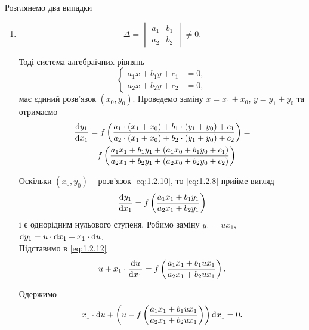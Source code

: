 Розглянемо два випадки
\begin{enumerate}
	\item 
	\begin{equation}
		\label{eq:1.2.9}
		\Delta = \begin{vmatrix} a_1 & b_1 \\ a_2 & b_2 \end{vmatrix} \ne 0.
	\end{equation}

	Тоді система алгебраїчних рівнянь
	\begin{equation}
		\label{eq:1.2.10}
		\left\{
			\begin{aligned}
				a_1 x + b_1 y + c_1 &= 0, \\
				a_2 x + b_2 y + c_2 &= 0,
			\end{aligned}
		\right.
	\end{equation}
	має єдиний розв’язок $(x_0, y_0)$. Проведемо заміну $x = x_1 + x_0$, $y = y_1 + y_0$ та отримаємо
	\begin{multline}
		\label{eq:1.2.11}
		\frac{\mathop{}\!\mathrm{d} y_1}{\mathop{}\!\mathrm{d} x_1} = f \left( \frac{a_1 \cdot (x_1 + x_0) + b_1 \cdot (y_1 + y_0) + c_1}{a_2 \cdot (x_1 + x_0) + b_2 \cdot (y_1 + y_0) + c_2} \right) = \\
		= f \left( \frac{a_1 x_1 + b_1 y_1 + (a_1 x_0 + b_1 y_0 + c_1)}{a_2 x_1 + b_2 y_1 + (a_2 x_0 + b_2 y_0 + c_2)} \right)
	\end{multline}

	Оскільки $(x_0, y_0)$ -- розв’язок \eqref{eq:1.2.10}, то \eqref{eq:1.2.8} прийме вигляд
	\begin{equation}
		\label{eq:1.2.12}
		\frac{\mathop{}\!\mathrm{d} y_1}{\mathop{}\!\mathrm{d} x_1} = f \left( \frac{a_1 x_1 + b_1 y_1}{a_2 x_1 + b_2 y_1} \right)
	\end{equation}
	і є однорідним нульового ступеня. Робимо заміну $y_1 = u x_1$, $\mathop{}\!\mathrm{d} y_1 = u \cdot \mathop{}\!\mathrm{d} x_1 + x_1 \cdot \mathop{}\!\mathrm{d} u$. \\

	Підставимо в \eqref{eq:1.2.12}
	\begin{equation}
		\label{eq:1.2.13}
		u + x_1 \cdot \frac{\mathop{}\!\mathrm{d} u}{\mathop{}\!\mathrm{d} x_1} = f \left( \frac{a_1 x_1 + b_1 u x_1}{a_2 x_1 + b_2 u x_1} \right).
	\end{equation}
	
	Одержимо
	\begin{equation}
		\label{eq:1.2.14}
		x_1 \cdot \mathop{}\!\mathrm{d} u + \left( u - f \left( \frac{a_1 x_1 + b_1 u x_1}{a_2 x_1 + b_2 u x_1} \right) \right) \mathop{}\!\mathrm{d} x_1 = 0.
	\end{equation}


\end{enumerate}
